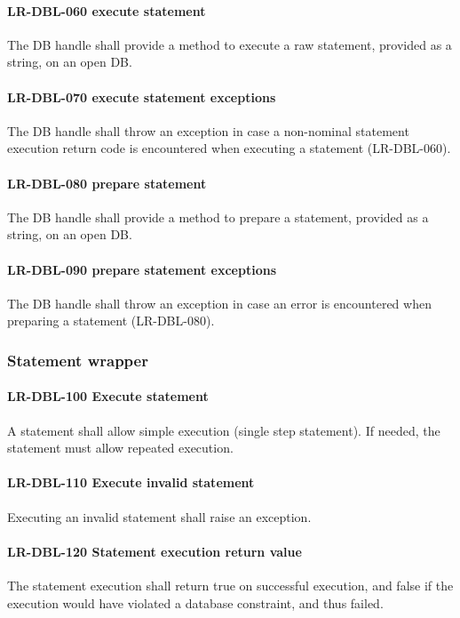 \paragraph{LR-DBL-060 execute statement}
The DB handle shall provide a method to execute a raw statement, provided
as a string, on an open DB.

\paragraph{LR-DBL-070 execute statement exceptions}
The DB handle shall throw an exception in case a non-nominal statement
execution return code is encountered when executing a statement (LR-DBL-060).

\paragraph{LR-DBL-080 prepare statement}
The DB handle shall provide a method to prepare a statement, provided
as a string, on an open DB.

\paragraph{LR-DBL-090 prepare statement exceptions}
The DB handle shall throw an exception in case an error is encountered when
preparing a statement (LR-DBL-080).

\subsubsection{Statement wrapper}
\paragraph{LR-DBL-100 Execute statement}
A statement shall allow simple execution (single step statement). If needed, the
statement must allow repeated execution.

\paragraph{LR-DBL-110 Execute invalid statement}
Executing an invalid statement shall raise an exception.

\paragraph{LR-DBL-120 Statement execution return value}
The statement execution shall return true on successful execution, and
false if the execution would have violated a database constraint, and thus
failed.

